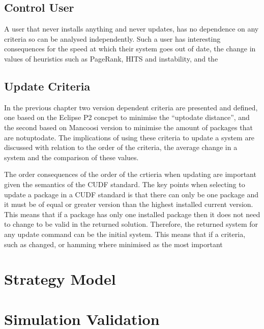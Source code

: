 



\subsection{Control User}
{}A user that never installs anything and never updates, has no dependence on any criteria so can be analysed independently.
{}Such a user has interesting consequences for the speed at which their system goes out of date, the change in values of heuristics such as PageRank, HITS and instability,
{}and the 

\subsection{Update Criteria}
{}In the previous chapter two version dependent criteria are presented and defined, one based on the Eclipse P2 concpet to minimise the ``uptodate distance'', 
{}and the second based on Mancoosi version to minimise the amount of packages that are notuptodate. 
{}The implications of using these criteria to update a system are discussed with relation to the order of the criteria, the average change in a system and the comparison of these values.

The order consequences of the order of the crtieria when updating are important given the semantics of the CUDF standard.
The key points when selecting to update a package in a CUDF standard is that there can only be one package and it must be of equal or greater version than the highest installed current version.
This means that if a package has only one installed package then it does not need to change to be valid in the returned solution.
Therefore, the returned system for any update command can be the initial system.
This means that if a criteria, such as changed, or hamming where minimised as the most important  


\section{Strategy Model}


\section{Simulation Validation}


